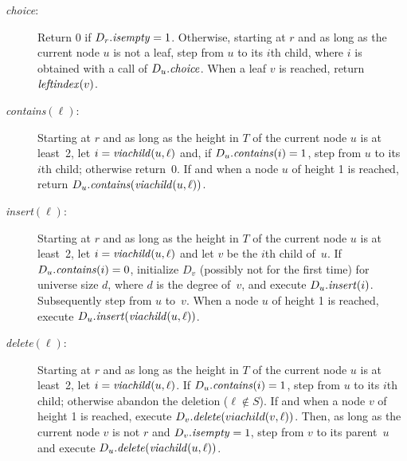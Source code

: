 \documentclass[envcountsame,envcountsect,undated,nolinenumbers]{lnthi}
\def\Tvn#1{\hbox{\textit{#1\/}}}
\begin{document}
\begin{description}
\item[\normalfont\Tvn{choice}:]
Return 0 if $D_r.\Tvn{isempty}=1$.
Otherwise,
starting at $r$ and as long as the current node
$u$ is not a leaf, step from $u$ to its $i$th child,
where $i$ is obtained with a call of $D_u.\Tvn{choice}$.
When a leaf $v$ is reached, return $\Tvn{leftindex}(v)$.
\item[\normalfont\Tvn{contains}$(\ell)$:]
Starting at $r$ and as long as the height in
$T$ of the current node $u$
is at least~2, let $i=\Tvn{viachild}(u,\ell)$
and, if $D_u.\Tvn{contains}(i)=1$,
step from $u$ to its $i$th child;
otherwise return~0.
If and when a node $u$ of height 1 is reached,
return $D_u.\Tvn{contains}(\Tvn{viachild}(u,\ell))$.
\item[\normalfont\Tvn{insert}$(\ell)$:]
Starting at $r$ and as long as
the height in $T$ of
the current node $u$ is at least~2,
let $i=\Tvn{viachild}(u,\ell)$ and let
$v$ be the $i$th child of~$u$.
If $D_u.\Tvn{contains}(i)=0$,
initialize $D_v$ (possibly not for the first time)
for universe size $d$, where $d$ is the degree of~$v$,
and execute $D_u.\Tvn{insert}(i)$.
Subsequently step from $u$ to~$v$.
When a node $u$ of height 1 is reached,
execute $D_u.\Tvn{insert}(\Tvn{viachild}(u,\ell))$.
\item[\normalfont\Tvn{delete}$(\ell)$:]
Starting at $r$ and as long as
the height in $T$ of the current node $u$ is at least~2,
let $i=\Tvn{viachild}(u,\ell)$.
If $D_u.\Tvn{contains}(i)=1$,
step from $u$ to its $i$th child;
otherwise abandon the deletion ($\ell\not\in S$).
If and when a node $v$ of height 1 is reached,
execute $D_v.\Tvn{delete}(viachild(v,\ell))$.
Then, as long as the current node $v$ is not $r$
and $D_v.\Tvn{isempty}=1$,
step from $v$ to its parent~$u$
and execute $D_u.\Tvn{delete}(\Tvn{viachild}(u,\ell))$.
\end{description}
\end{document}
